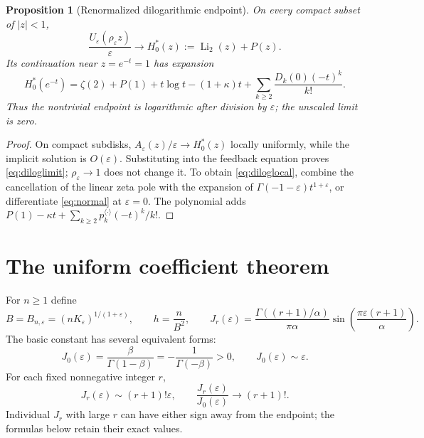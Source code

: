 \documentclass[11pt,a4paper]{article}
\newtheorem{proposition}[theorem]{Proposition}
\theoremstyle{definition}\newtheorem{definition}[theorem]{Definition}
\theoremstyle{remark}\newtheorem{remark}[theorem]{Remark}
\newcommand{\eps}{\varepsilon}
\newcommand{\Li}{\operatorname{Li}}
\newcommand{\1}{\mathbf 1}
\begin{document}
\begin{proposition}[Renormalized dilogarithmic endpoint]
\label{prop:dilog}
On every compact subset of $|z|<1$,
\begin{equation}\label{eq:diloglimit}
 \frac{U_{\eps}(\rho_{\eps}z)}{\eps}
 \longrightarrow H_0^*(z):=\Li_2(z)+P(z).
\end{equation}
Its continuation near $z=e^{-t}=1$ has expansion
\begin{equation}\label{eq:diloglocal}
 H_0^*(e^{-t})=\zeta(2)+P(1)+t\log t-(1+\kappa)t
       +\sum_{k\ge2}\frac{D_k(0)(-t)^k}{k!}.
\end{equation}
Thus the nontrivial endpoint is logarithmic after division by $\eps$;
the unscaled limit is zero.
\end{proposition}
\begin{proof}
On compact subdisks, $A_{\eps}(z)/\eps\to H_0^*(z)$ locally uniformly,
while the implicit solution is $O(\eps)$. Substituting into the feedback
equation proves \eqref{eq:diloglimit}; $\rho_{\eps}\to1$ does not change
it. To obtain \eqref{eq:diloglocal}, combine the cancellation of the
linear zeta pole with the expansion of $\Gamma(-1-\eps)t^{1+\eps}$,
or differentiate \eqref{eq:normal} at $\eps=0$. The polynomial adds
$P(1)-\kappa t+\sum_{k\ge2}p_k^{\langle\cdot\rangle}(-t)^k/k!$.
\end{proof}

\section{The uniform coefficient theorem}
\label{sec:coefficient}

For $n\ge1$ define
\begin{equation}\label{eq:BJ}
 B=B_{n,\eps}=(nK_{\eps})^{1/(1+\eps)},\qquad
 h=\frac n{B^2},\qquad
 J_r(\eps)=\frac{\Gamma((r+1)/\alpha)}{\pi\alpha}
            \sin\!\left(\frac{\pi\eps(r+1)}\alpha\right).
\end{equation}
The basic constant has several equivalent forms:
\begin{equation}\label{eq:J0}
 J_0(\eps)=\frac{\beta}{\Gamma(1-\beta)}
          =-\frac1{\Gamma(-\beta)}>0,
 \qquad J_0(\eps)\sim\eps.
\end{equation}
For each fixed nonnegative integer $r$,
\begin{equation}\label{eq:Jlimit}
 J_r(\eps)\sim(r+1)!\eps,\qquad
 \frac{J_r(\eps)}{J_0(\eps)}\longrightarrow(r+1)!.
\end{equation}
Individual $J_r$ with large $r$ can have either sign away from the
endpoint; the formulas below retain their exact values.
\end{document}
